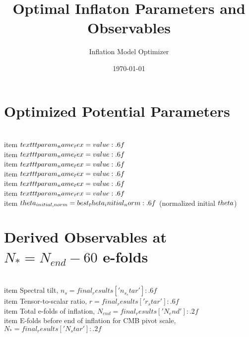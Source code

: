 \documentclass{article}
\title{Optimal Inflaton Parameters and Observables}
\date{\today}
\author{Inflation Model Optimizer}
\begin{document}
\maketitle
\section*{Optimized Potential Parameters}
\begin{itemize}
  \\item $\\texttt{{{param_name_tex}}} = {value:.6f}$\n  \\item $\\texttt{{{param_name_tex}}} = {value:.6f}$\n  \\item $\\texttt{{{param_name_tex}}} = {value:.6f}$\n  \\item $\\texttt{{{param_name_tex}}} = {value:.6f}$\n  \\item $\\texttt{{{param_name_tex}}} = {value:.6f}$\n  \\item $\\texttt{{{param_name_tex}}} = {value:.6f}$\n  \\item $\\theta_{{initial,norm}} = {best_theta_initial_norm:.6f}$ (normalized initial $\\theta$)\n\end{itemize}
\section*{Derived Observables at $N_* = N_{{end}} - 60$ e-folds}
\begin{itemize}
  \\item Spectral tilt, $n_s = {final_results['n_s_star']:.6f}$\n  \\item Tensor-to-scalar ratio, $r = {final_results['r_star']:.6f}$\n  \\item Total e-folds of inflation, $N_{{end}} = {final_results['N_end']:.2f}$\n  \\item E-folds before end of inflation for CMB pivot scale, $N_* = {final_results['N_star']:.2f}$\n\end{itemize}
\end{document}
